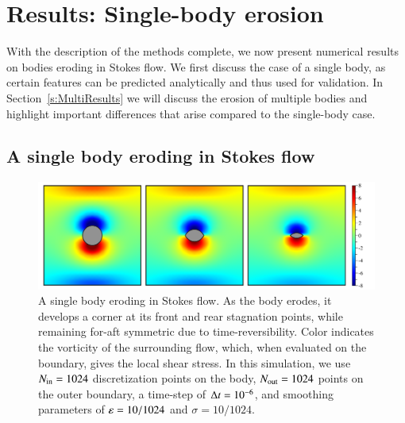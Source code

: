 \documentclass[preprint, 10pt]{elsarticle}
\begin{document}
\section{Results: Single-body erosion}
\label{s:SingleResults}
With the description of the methods complete, we now present numerical results on bodies eroding in Stokes flow. We first discuss the case of a single body, as certain features can be predicted analytically and thus used for validation. In Section~\ref{s:MultiResults} we will discuss the erosion of multiple bodies and highlight important differences that arise compared to the single-body case.

\subsection{A single body eroding in Stokes flow}

\begin{figure}%
\begin{center}
\includegraphics[width = 0.80 \textwidth]{./figs/01bodseq.pdf}
\caption{A single body eroding in Stokes flow. As the body erodes, it develops a corner at its front and rear stagnation points, while remaining for-aft symmetric due to time-reversibility. Color indicates the vorticity of the surrounding flow, which, when evaluated on the boundary, gives the local shear stress. In this simulation, we use $N_{\mathrm{in}} = 1024$ discretization points on the body, $N_{\mathrm{out}} = 1024$ points on the outer boundary, a time-step of $\Delta t = 10^{-6}$, and smoothing parameters of $\varepsilon = 10/1024$ and $\sigma = 10/1024$.}
\label{01bodseq} 
\end{center}
\end{figure}
\end{document}
